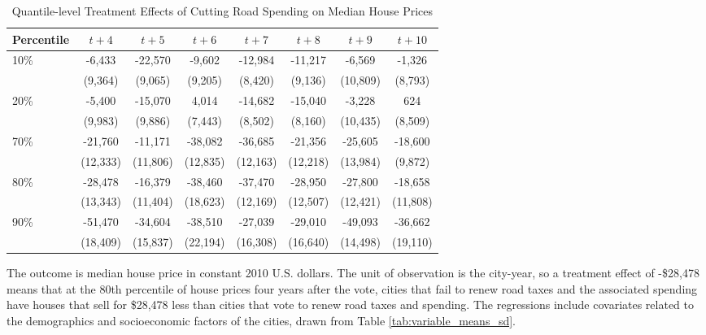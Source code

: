\begin{table}[ht]
    \hspace{-1cm}
    \caption{Quantile-level Treatment Effects of Cutting Road Spending on Median House Prices}
    \label{tab:quantile_tes}
    \begin{tabular}{p{1.5cm}ccccccc}
        \hline
        Percentile & $t + 4$ & $t + 5$ & $t + 6$ & $t + 7$ & $t + 8$ & $t + 9$ & $t + 10$ \\
        \hline
        10\% & -6,433 & -22,570 & -9,602 & -12,984 & -11,217 & -6,569 & -1,326 \\
        & (9,364) & (9,065) & (9,205) & (8,420) & (9,136) & (10,809) & (8,793) \\
        20\% & -5,400 & -15,070 & 4,014 & -14,682 & -15,040 & -3,228 & 624 \\
        & (9,983) & (9,886) & (7,443) & (8,502) & (8,160) & (10,435) & (8,509) \\
        70\% & -21,760 & -11,171 & -38,082 & -36,685 & -21,356 & -25,605 & -18,600 \\
        & (12,333) & (11,806) & (12,835) & (12,163) & (12,218) & (13,984) & (9,872) \\
        80\% & -28,478 & -16,379 & -38,460 & -37,470 & -28,950 & -27,800 & -18,658 \\
        & (13,343) & (11,404) & (18,623) & (12,169) & (12,507) & (12,421) & (11,808) \\
        90\% & -51,470 & -34,604 & -38,510 & -27,039 & -29,010 & -49,093 & -36,662 \\
        & (18,409) & (15,837) & (22,194) & (16,308) & (16,640) & (14,498) & (19,110) \\
        \hline
    \end{tabular}
    \begin{tablenotes}
        \small
        \item The outcome is median house price in constant 2010 U.S. dollars. The unit of observation is the city-year, so a treatment effect of -\$28,478 means that at the 80th percentile of house prices four years after the vote, cities that fail to renew road taxes and the associated spending have houses that sell for \$28,478 less than cities that vote to renew road taxes and spending. The regressions include covariates related to the demographics and socioeconomic factors of the cities, drawn from Table \ref{tab:variable_means_sd}.
    \end{tablenotes}
\end{table}

